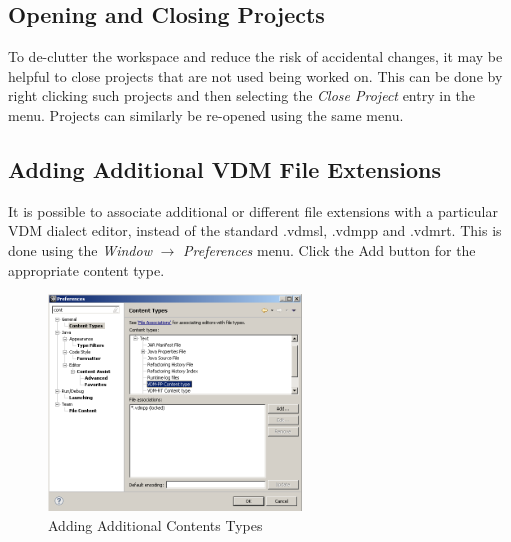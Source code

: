 \documentclass{overturerepchap}
\begin{document}
\subsection{Opening and Closing Projects}

To de-clutter the workspace and reduce the risk of accidental changes,
it may be helpful to close projects that are not used being worked on.
This can be done by right clicking such projects and then selecting the
\emph{Close Project} entry in the menu. Projects can similarly be re-opened
using the same menu. 
 

\subsection{Adding Additional VDM File Extensions}

It is possible to associate additional or different file extensions with a
particular VDM dialect editor, instead of the standard {\ttfamily .vdmsl},
{\ttfamily .vdmpp} and {\ttfamily .vdmrt}. This is done using the \emph{Window}
$\rightarrow$ \emph{Preferences} menu. Click the Add
button for the appropriate content type.

\begin{figure}[!htb]
\begin{center}
\includegraphics[width=0.6\textwidth]{screenDumps/contentstypes}
\caption{Adding Additional Contents Types\label{fig:ContentsTypes}}
\end{center}
\end{figure}
\end{document}
